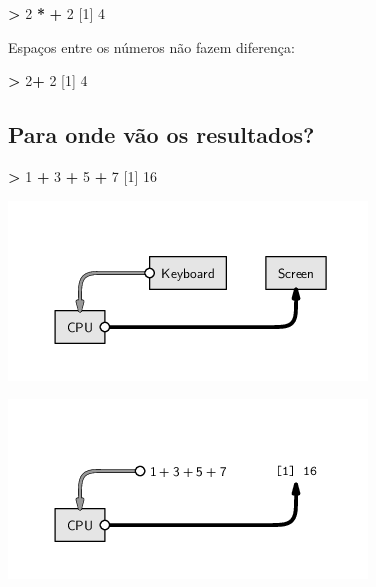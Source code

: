 \documentclass[10pt,a4paper]{book}
\newenvironment{Shaded}{\begin{snugshade}}{\end{snugshade}}
\newcommand{\DecValTok}[1]{\textcolor[rgb]{0.00,0.00,0.81}{#1}}
\newcommand{\StringTok}[1]{\textcolor[rgb]{0.31,0.60,0.02}{#1}}
\newcommand{\OperatorTok}[1]{\textcolor[rgb]{0.81,0.36,0.00}{\textbf{#1}}}
\newcommand{\NormalTok}[1]{#1}
\begin{document}
\begin{Shaded}
\begin{Highlighting}[]
\OperatorTok{>}\StringTok{ }\DecValTok{2} \OperatorTok{*}
\OperatorTok{+}\StringTok{ }\DecValTok{2}
\NormalTok{[}\DecValTok{1}\NormalTok{] }\DecValTok{4}
\end{Highlighting}
\end{Shaded}

Espaços entre os números não fazem diferença:

\begin{Shaded}
\begin{Highlighting}[]
\OperatorTok{>}\StringTok{ }\DecValTok{2}\OperatorTok{+}\StringTok{         }\DecValTok{2}
\NormalTok{[}\DecValTok{1}\NormalTok{] }\DecValTok{4}
\end{Highlighting}
\end{Shaded}

\subsection{Para onde vão os
resultados?}\label{para-onde-vao-os-resultados}

\begin{Shaded}
\begin{Highlighting}[]
\OperatorTok{>}\StringTok{ }\DecValTok{1} \OperatorTok{+}\StringTok{ }\DecValTok{3} \OperatorTok{+}\StringTok{ }\DecValTok{5} \OperatorTok{+}\StringTok{ }\DecValTok{7}
\NormalTok{[}\DecValTok{1}\NormalTok{] }\DecValTok{16}
\end{Highlighting}
\end{Shaded}

\begin{center}\includegraphics[width=0.5\linewidth]{img/script-commandline} \end{center}

\begin{center}\includegraphics[width=0.5\linewidth]{img/script-commandlinedata} \end{center}
\end{document}
